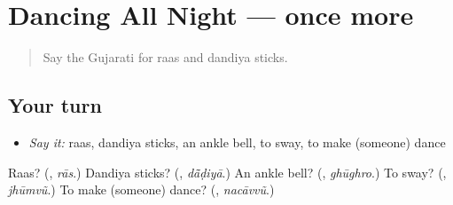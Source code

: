 \section[(dialogue)]{Dancing All Night — once more}

\label{lesson:GU-R554-review-final-554}



\begin{quote}
Say the Gujarati for raas and dandiya sticks.
\end{quote}

\subsection*{Your turn}
\begin{itemize}
\raggedright
  \item \emph{Say it:} raas, dandiya sticks, an ankle bell, to sway, to make (someone) dance
\end{itemize}

\begin{tcolorbox}[breakable,colback=teal!4,colframe=teal!35!black,title={Before you move on}]
Raas? (\textbf{}, \emph{rās}.) Dandiya sticks? (\textbf{}, \emph{dā̃ḍiyā}.) An ankle bell? (\textbf{}, \emph{ghūghro}.) To sway? (\textbf{}, \emph{jhūmvũ}.) To make (someone) dance? (\textbf{}, \emph{nacāvvũ}.)
\end{tcolorbox}
